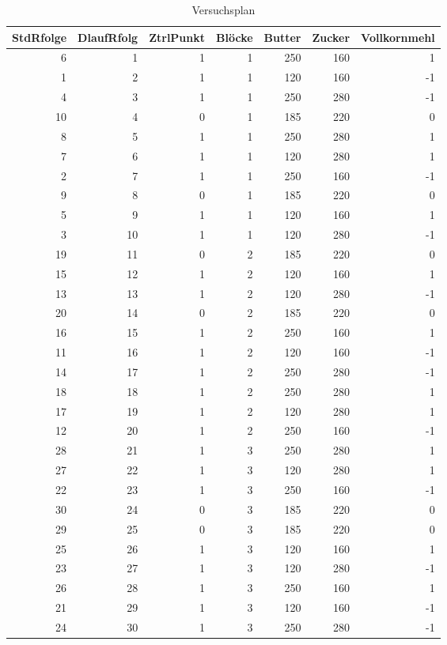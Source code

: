 \begin{table}[H]
\centering
\caption{Versuchsplan}
\label{table:versuchsplan}
\begin{tabular}{|r|r|r|r|r|r|r|}
\hline
StdRfolge & DlaufRfolg & ZtrlPunkt & Blöcke & Butter & Zucker & Vollkornmehl \\
\hline
6  & 1  & 1 & 1 & 250 & 160 & 1  \\
1  & 2  & 1 & 1 & 120 & 160 & -1 \\
4  & 3  & 1 & 1 & 250 & 280 & -1 \\
10 & 4  & 0 & 1 & 185 & 220 & 0  \\
8  & 5  & 1 & 1 & 250 & 280 & 1  \\
7  & 6  & 1 & 1 & 120 & 280 & 1  \\
2  & 7  & 1 & 1 & 250 & 160 & -1 \\
9  & 8  & 0 & 1 & 185 & 220 & 0  \\
5  & 9  & 1 & 1 & 120 & 160 & 1  \\
3  & 10 & 1 & 1 & 120 & 280 & -1 \\
\hline
19 & 11 & 0 & 2 & 185 & 220 & 0  \\
15 & 12 & 1 & 2 & 120 & 160 & 1  \\
13 & 13 & 1 & 2 & 120 & 280 & -1 \\
20 & 14 & 0 & 2 & 185 & 220 & 0  \\
16 & 15 & 1 & 2 & 250 & 160 & 1  \\
11 & 16 & 1 & 2 & 120 & 160 & -1 \\
14 & 17 & 1 & 2 & 250 & 280 & -1 \\
18 & 18 & 1 & 2 & 250 & 280 & 1  \\
17 & 19 & 1 & 2 & 120 & 280 & 1  \\
12 & 20 & 1 & 2 & 250 & 160 & -1 \\
\hline
28 & 21 & 1 & 3 & 250 & 280 & 1  \\
27 & 22 & 1 & 3 & 120 & 280 & 1  \\
22 & 23 & 1 & 3 & 250 & 160 & -1 \\
30 & 24 & 0 & 3 & 185 & 220 & 0  \\
29 & 25 & 0 & 3 & 185 & 220 & 0  \\
25 & 26 & 1 & 3 & 120 & 160 & 1  \\
23 & 27 & 1 & 3 & 120 & 280 & -1 \\
26 & 28 & 1 & 3 & 250 & 160 & 1  \\
21 & 29 & 1 & 3 & 120 & 160 & -1 \\
24 & 30 & 1 & 3 & 250 & 280 & -1 \\
\hline
\end{tabular}
\end{table}
